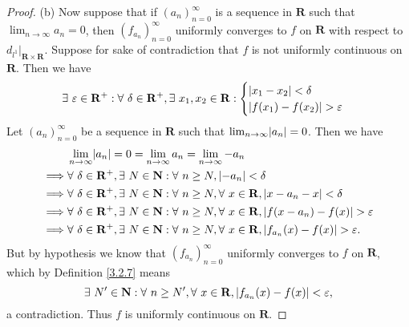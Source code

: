 \begin{proof}{(b)}
    Now suppose that if \((a_n)_{n = 0}^\infty\) is a sequence in \(\mathbf{R}\) such that \(\lim_{n \to \infty} a_n = 0\), then \((f_{a_n})_{n = 0}^\infty\) uniformly converges to \(f\) on \(\mathbf{R}\) with respect to \(d_{l^1}|_{\mathbf{R} \times \mathbf{R}}\).
    Suppose for sake of contradiction that \(f\) is not uniformly continuous on \(\mathbf{R}\).
    Then we have
    \[
        \exists\ \varepsilon \in \mathbf{R}^+ : \forall\ \delta \in \mathbf{R}^+, \exists\ x_1, x_2 \in \mathbf{R} : \begin{cases}
            \abs*{x_1 - x_2} < \delta \\
            \abs*{f(x_1) - f(x_2)} > \varepsilon
        \end{cases}
    \]
    Let \((a_n)_{n = 0}^\infty\) be a sequence in \(\mathbf{R}\) such that \(\lim_{n \to \infty} \abs*{a_n} = 0\).
    Then we have
    \begin{align*}
                 & \lim_{n \to \infty} \abs*{a_n} = 0 = \lim_{n \to \infty} a_n = \lim_{n \to \infty} -a_n                                                             \\
        \implies & \forall\ \delta \in \mathbf{R}^+, \exists\ N \in \mathbf{N} : \forall\ n \geq N, \abs*{-a_n} < \delta                                               \\
        \implies & \forall\ \delta \in \mathbf{R}^+, \exists\ N \in \mathbf{N} : \forall\ n \geq N, \forall\ x \in \mathbf{R}, \abs*{x - a_n - x} < \delta             \\
        \implies & \forall\ \delta \in \mathbf{R}^+, \exists\ N \in \mathbf{N} : \forall\ n \geq N, \forall\ x \in \mathbf{R}, \abs*{f(x - a_n) - f(x)} > \varepsilon  \\
        \implies & \forall\ \delta \in \mathbf{R}^+, \exists\ N \in \mathbf{N} : \forall\ n \geq N, \forall\ x \in \mathbf{R}, \abs*{f_{a_n}(x) - f(x)} > \varepsilon.
    \end{align*}
    But by hypothesis we know that \((f_{a_n})_{n = 0}^\infty\) uniformly converges to \(f\) on \(\mathbf{R}\), which by Definition \ref{3.2.7} means
    \[
        \exists\ N' \in \mathbf{N} : \forall\ n \geq N', \forall\ x \in \mathbf{R}, \abs*{f_{a_n}(x) - f(x)} < \varepsilon,
    \]
    a contradiction.
    Thus \(f\) is uniformly continuous on \(\mathbf{R}\).
\end{proof}

